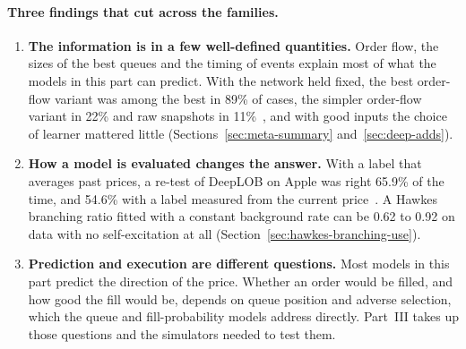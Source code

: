 \paragraph{Three findings that cut across the families.}
\begin{enumerate}[leftmargin=1.8em,itemsep=2pt]
\item \textbf{The information is in a few well-defined quantities.} Order flow, the sizes of the best queues and
  the timing of events explain most of what the models in this part can predict. With the network held fixed,
  the best order-flow variant was among the best in 89\% of cases, the simpler order-flow variant in 22\% and raw
  snapshots in 11\%~\citep{lucchese2024}, and with
  good inputs the choice of learner mattered little (Sections~\ref{sec:meta-summary} and~\ref{sec:deep-adds}).
\item \textbf{How a model is evaluated changes the answer.} With a label that averages past prices, a re-test of
  DeepLOB on Apple was right 65.9\% of the time, and 54.6\% with a label measured from the current
  price~\citep{lee2024predictability}. A Hawkes branching ratio fitted with a constant background rate can
  be 0.62 to 0.92 on data with no self-excitation at all (Section~\ref{sec:hawkes-branching-use}).
\item \textbf{Prediction and execution are different questions.} Most models in this part predict the direction
  of the price. Whether an order would be filled, and how good the fill would be, depends on queue position and
  adverse selection, which the queue and fill-probability models address directly. Part~III takes up those
  questions and the simulators needed to test them.
\end{enumerate}
